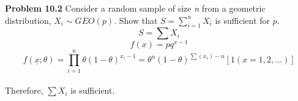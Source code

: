 \documentclass[12pt]{article}
\begin{document}
{\bf Problem 10.2} Consider a random sample of size \textit{n} from a geometric distribution, $ X_{i} \sim GEO(p). $ Show that $ S=\sum_{i=1}^{n}X_{i} $ is sufficient for $ p. $ 
\\ \[ S=\sum X_{i}\] \[f(x)=pq^{x-1}\] \[f( \underline{x}; \theta )=\prod_{i=1}^{n} \theta (1- \theta )^{x_{i}-1}= \theta^{n} (1- \theta )^{\sum (x_{i})-n}[1(x=1,2,...)] \]
\\ Therefore, $ \sum X_{i} $ is sufficient.
\end{document}
